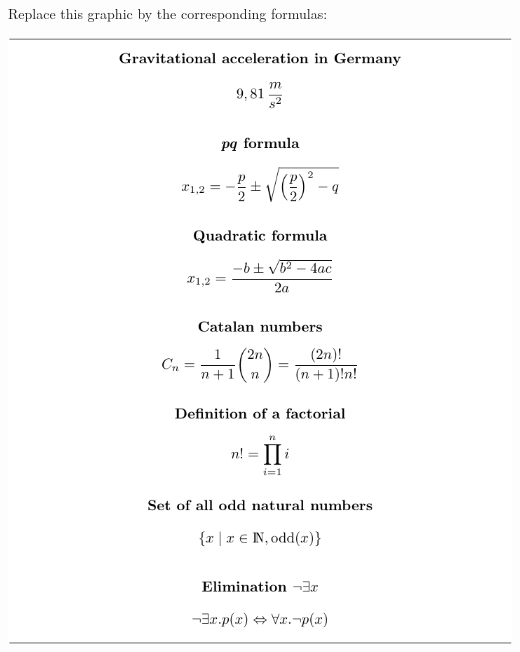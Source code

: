 
Replace this graphic by the corresponding formulas:

\vspace{1cm} %
\includegraphics{graphics/math-formulas.rend-crop.pdf}
